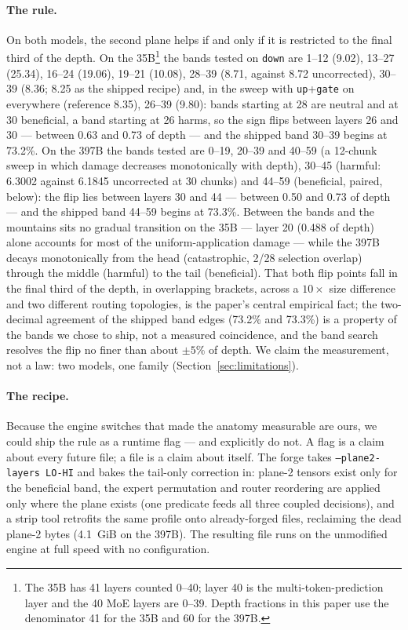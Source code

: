 \documentclass[10pt]{article} %
\begin{document}
\paragraph{The rule.} On both models, the second plane helps if and only if it is
restricted to the final third of the depth. On the 35B\footnote{The 35B has
41 layers counted 0--40; layer 40 is the multi-token-prediction layer and the
40 MoE layers are 0--39. Depth fractions in this paper use the denominator 41
for the 35B and 60 for the 397B.} the bands tested on \texttt{down} are 1--12
(9.02), 13--27 (25.34), 16--24 (19.06), 19--21 (10.08), 28--39 (8.71, against
8.72 uncorrected), 30--39 (8.36; 8.25 as the shipped recipe) and, in the sweep
with \texttt{up}+\texttt{gate} on everywhere (reference 8.35), 26--39 (9.80): bands starting at 28 are neutral and at 30 beneficial, a band
starting at 26 harms, so the sign flips between layers 26 and 30 --- between
0.63 and 0.73 of depth --- and the shipped band 30--39 begins at 73.2\%. On the
397B the bands tested are 0--19, 20--39 and 40--59 (a 12-chunk sweep in which
damage decreases monotonically with depth), 30--45 (harmful: 6.3002 against
6.1845 uncorrected at 30 chunks) and 44--59 (beneficial, paired, below): the
flip lies between layers 30 and 44 --- between 0.50 and 0.73 of depth --- and
the shipped band 44--59 begins at 73.3\%. Between the bands and
the mountains sits no gradual transition on the 35B --- layer 20 (0.488 of
depth) alone accounts for most of the uniform-application damage --- while
the 397B decays monotonically from the head (catastrophic, 2/28 selection
overlap) through the middle (harmful) to the tail (beneficial). That both flip
points fall in the final third of the depth, in overlapping brackets, across a
$10\times$ size difference and two different routing topologies, is the
paper's central empirical fact; the two-decimal agreement of the shipped
band edges (73.2\% and 73.3\%) is a property of the bands we chose to ship,
not a measured coincidence, and the band search resolves the flip no finer
than about $\pm 5\%$ of depth. We claim the measurement, not a law: two models,
one family (Section~\ref{sec:limitations}).

\paragraph{The recipe.} Because the engine switches that made the anatomy measurable
are ours, we could ship the rule as a runtime flag --- and explicitly do not.
A flag is a claim about every future file; a file is a claim about itself.
The forge takes \texttt{--plane2-layers LO-HI} and bakes the tail-only correction
in: plane-2 tensors exist only for the beneficial band, the expert
permutation and router reordering are applied only where the plane exists
(one predicate feeds all three coupled decisions), and a strip tool
retrofits the same profile onto already-forged files, reclaiming the dead
plane-2 bytes (4.1~GiB on the 397B). The resulting file runs on the
unmodified engine at full speed with no configuration.
\end{document}
